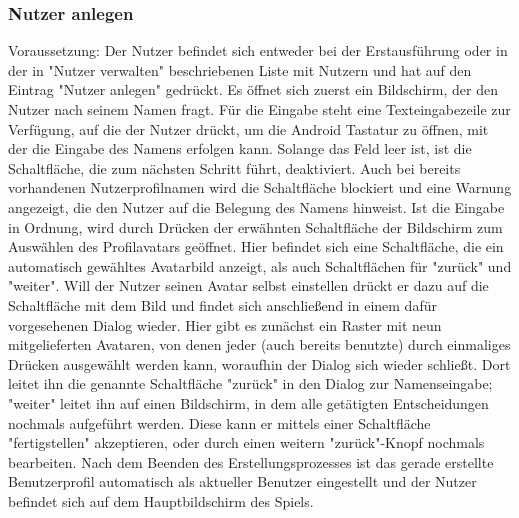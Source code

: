 \subsubsection{Nutzer anlegen}
Voraussetzung: Der Nutzer befindet sich entweder bei der Erstausführung oder 
in der in "Nutzer verwalten" beschriebenen Liste mit Nutzern und hat auf 
den Eintrag "Nutzer anlegen" gedrückt.
\newline
\newline
Es öffnet sich zuerst ein Bildschirm, der den Nutzer nach seinem Namen fragt.
Für die Eingabe steht eine Texteingabezeile zur Verfügung, auf die der
Nutzer drückt, um die Android Tastatur zu öffnen, mit der die Eingabe des
Namens erfolgen kann. Solange das Feld leer ist, ist die Schaltfläche, 
die zum nächsten Schritt führt, deaktiviert. Auch bei bereits vorhandenen
Nutzerprofilnamen wird die Schaltfläche blockiert und eine Warnung angezeigt,
die den Nutzer auf die Belegung des Namens hinweist. Ist die Eingabe
in Ordnung, wird durch Drücken der erwähnten Schaltfläche der Bildschirm
zum Auswählen des Profilavatars geöffnet. Hier befindet sich eine
Schaltfläche, die ein automatisch gewähltes Avatarbild anzeigt,
als auch Schaltflächen für "zurück" und "weiter". Will der Nutzer seinen 
Avatar selbst einstellen drückt er dazu auf die Schaltfläche mit dem Bild
und findet sich anschließend in einem dafür vorgesehenen Dialog wieder.
Hier gibt es zunächst ein Raster mit neun mitgelieferten Avataren,
von denen jeder (auch bereits benutzte) durch einmaliges Drücken ausgewählt
werden kann, woraufhin der Dialog sich wieder schließt. Dort leitet ihn
die genannte Schaltfläche "zurück" in den Dialog zur Namenseingabe; "weiter"
leitet ihn auf einen Bildschirm, in dem alle getätigten Entscheidungen
nochmals aufgeführt werden. Diese kann er mittels einer Schaltfläche 
"fertigstellen" akzeptieren, oder durch einen weitern "zurück"-Knopf 
nochmals bearbeiten.
\newline
\newline
Nach dem Beenden des Erstellungsprozesses ist das gerade erstellte 
Benutzerprofil automatisch als aktueller Benutzer eingestellt und der Nutzer
befindet sich auf dem Hauptbildschirm des Spiels.
